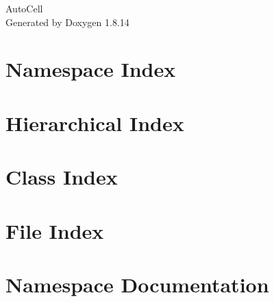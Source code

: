 \documentclass[twoside]{book}
\newcommand{\+}{\discretionary{\mbox{\scriptsize$\hookleftarrow$}}{}{}}
\newcommand{\clearemptydoublepage}{%
  \newpage{\pagestyle{empty}\cleardoublepage}%
}
\begin{document}
\hypersetup{pageanchor=false,
             bookmarksnumbered=true,
             pdfencoding=unicode
            }
\begin{titlepage}
\vspace*{7cm}
\begin{center}%
{\Large Auto\+Cell }\\
\vspace*{1cm}
{\large Generated by Doxygen 1.8.14}\\
\end{center}
\end{titlepage}
\clearemptydoublepage
{}
\tableofcontents
\clearemptydoublepage
{}
\hypersetup{pageanchor=true}

\chapter{Namespace Index}

\chapter{Hierarchical Index}

\chapter{Class Index}

\chapter{File Index}

\chapter{Namespace Documentation}

\end{document}
